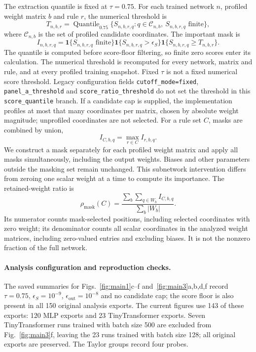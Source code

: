 \documentclass{article}
\begin{document}
The extraction quantile is fixed at $\tau=0.75$. For each trained network $n$, profiled weight matrix $b$ and rule $r$, the numerical threshold is
\begin{equation}
T_{n,b,r}=\operatorname{Quantile}_{0.75}\{S_{n,b,r,q}:q\in\mathcal C_{n,b},\ S_{n,b,r,q}\text{ finite}\},
\end{equation}
where $\mathcal C_{n,b}$ is the set of profiled candidate coordinates. The important mask is
\begin{equation}
I_{n,b,r,q}=\mathbf{1}\{S_{n,b,r,q}\text{ finite}\}\mathbf{1}\{S_{n,b,r,q}>\epsilon_S\}\mathbf{1}\{S_{n,b,r,q}\ge T_{n,b,r}\}.
\end{equation}
The quantile is computed before score-floor filtering, so finite zero scores enter its calculation. The numerical threshold is recomputed for every network, matrix and rule, and at every profiled training snapshot. Fixed $\tau$ is not a fixed numerical score threshold. Legacy configuration fields \texttt{cutoff\_mode=fixed}, \texttt{panel\_a\_threshold} and \texttt{score\_ratio\_threshold} do not set the threshold in this \texttt{score\_quantile} branch. If a candidate cap is supplied, the implementation profiles at most that many coordinates per matrix, chosen by absolute weight magnitude; unprofiled coordinates are not selected. For a rule set $C$, masks are combined by union,
\begin{equation}
I_{C,b,q}=\max_{r\in C}I_{r,b,q}.
\end{equation}
We construct a mask separately for each profiled weight matrix and apply all masks simultaneously, including the output weights. Biases and other parameters outside the masking set remain unchanged. This subnetwork intervention differs from zeroing one scalar weight at a time to compute its importance. The retained-weight ratio is
\begin{equation}
\rho_{\mathrm{mask}}(C)=\frac{\sum_b\sum_{q\in W_b}I_{C,b,q}}{\sum_b|W_b|}.
\end{equation}
Its numerator counts mask-selected positions, including selected coordinates with zero weight; its denominator counts all scalar coordinates in the analyzed weight matrices, including zero-valued entries and excluding biases. It is not the nonzero fraction of the full network.


\paragraph{Analysis configuration and reproduction checks.}
The saved summaries for Figs.~\ref{fig:main1}c--f and~\ref{fig:main3}a,b,d,f record $\tau=0.75$, $\epsilon_S=10^{-9}$, $\epsilon_{\mathrm{out}}=10^{-8}$ and no candidate cap; the score floor is also present in all 150 original analysis exports. The current figures use 143 of these exports: 120 MLP exports and 23 TinyTransformer exports. Seven TinyTransformer runs trained with batch size 500 are excluded from Fig.~\ref{fig:main3}f, leaving the 23 runs trained with batch size 128; all original exports are preserved. The Taylor groups record four probes.
\end{document}
